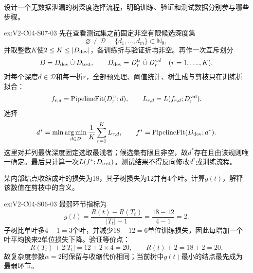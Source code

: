 \begin{SLChapterExercisePairSection}
\begin{exercise}\label{ex:V2-C04-S07-03}
设计一个无数据泄漏的树深度选择流程，明确训练、验证和测试数据分别参与哪些步骤。
\end{exercise}
\ifSLFullEdition
{}\label{sol:V2-C04-S07-03}
\begin{chapterexercisesolution}{ex:V2-C04-S07-03}
先在查看测试集之前固定非空有限候选深度集
\[
\varnothing\neq\mathcal D=\{d_1,\ldots,d_m\}\subset\mathbb N_0,
\]
并取整数$K$使$2\leq K\leq |D_{\rm dev}|$，各训练折与验证折均非空。再作一次互斥划分
\[
D=D_{\rm dev}\mathbin{\dot\cup}D_{\rm test},
\qquad
D_{\rm dev}=D_r^{\rm tr}\mathbin{\dot\cup}D_r^{\rm val}\quad(r=1,\ldots,K).
\]
对每个深度$d\in\mathcal D$和每一折$r$，全部预处理、阈值统计、树生成与剪枝只在训练折拟合：
\[
f_{r,d}=\operatorname{PipelineFit}(D_r^{\rm tr};d),
\qquad
L_{r,d}=L(f_{r,d};D_r^{\rm val}).
\]
选择
\[
d^*=\min\underset{d\in\mathcal D}{\arg\min}\,
\frac1K\sum_{r=1}^{K}L_{r,d},
\qquad
f^*=\operatorname{PipelineFit}(D_{\rm dev};d^*).
\]
这里对并列最优深度固定选取最浅者；候选集有限且非空，故$d^*$存在且由该规则唯一确定。最后只计算一次$L(f^*;D_{\rm test})$。测试结果不得反向修改$d^*$或训练流程。
\end{chapterexercisesolution}
\fi

\begin{exercise}\label{ex:V2-C04-S06-03}
某内部结点收缩成叶的损失为18，其子树损失为12并有4个叶。计算$g(t)$，解释该数值在剪枝中的含义。
\end{exercise}
\ifSLFullEdition
{}\label{sol:V2-C04-S06-03}
\begin{chapterexercisesolution}{ex:V2-C04-S06-03}
最弱环节指标为
\[
g(t)
=\frac{R(t)-R(T_t)}{|T_t|-1}
=\frac{18-12}{4-1}
=2.
\]
子树比单叶多$4-1=3$个叶，并减少$18-12=6$单位训练损失，因此每增加一个叶平均换来2单位损失下降。验证等价点：
\[
R(T_t)+2|T_t|=12+2\times4=20,
\qquad
R(t)+2=18+2=20.
\]
故复杂度参数$\alpha=2$时保留与收缩代价相同；当前树中$g(t)$最小的结点最先成为最弱环节。
\end{chapterexercisesolution}
\fi

\end{SLChapterExercisePairSection}
